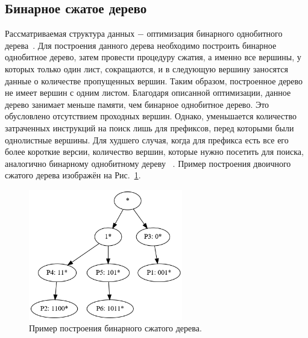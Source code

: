 \documentclass[a4paper, 12pt, titlepage, finall]{extreport}
\begin{document}
        \subsection{Бинарное сжатое дерево}
        \label{section:bctrev}
            Рассматриваемая структура данных $-$ оптимизация бинарного однобитного дерева~\cite{ruiz2001survey}. Для построения данного дерева необходимо построить бинарное однобитное дерево, 
            затем провести процедуру сжатия, а именно все вершины, у которых только один лист, сокращаются, и в следующую вершину заносятся данные о 
            количестве пропущенных вершин. Таким образом, построенное дерево не имеет вершин с одним листом. Благодаря описанной оптимизации, данное дерево
            занимает меньше памяти, чем бинарное однобитное дерево. Это обусловлено отсутствием проходных вершин. Однако, уменьшается количество затраченных инструкций на поиск лишь 
            для префиксов, перед которыми были однолистные вершины. Для худшего случая, когда для префикса есть все его более короткие версии, количество вершин, 
            которые нужно посетить для поиска, аналогично бинарному однобитному дереву ~\cite{ruiz2001survey}. Пример построения двоичного сжатого дерева изображён на Рис.~\ref{fig:mesh2}.

            \begin{figure}[h]
                \centering
                \includegraphics[width=0.6\textwidth]{compressed_binary.png}
                \caption{Пример построения бинарного сжатого дерева.}\label{fig:mesh2}
            \end{figure}
\end{document}

